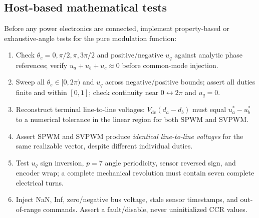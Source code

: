 \documentclass[10pt,letterpaper]{article}
\newcommand{\Vdc}{V_{\mathrm{dc}}}
\begin{document}
\subsection{Host-based mathematical tests}
Before any power electronics are connected, implement property-based or exhaustive-angle tests for the pure modulation function:
\begin{enumerate}
\item Check $\theta_e=0,\pi/2,\pi,3\pi/2$ and positive/negative $u_q$ against analytic phase references; verify $u_a+u_b+u_c\approx0$ before common-mode injection.
\item Sweep all $\theta_e\in[0,2\pi)$ and $u_q$ across negative/positive bounds; assert all duties finite and within $[0,1]$; check continuity near $0\leftrightarrow2\pi$ and $u_q=0$.
\item Reconstruct terminal line-to-line voltages: $\Vdc(d_a-d_b)$ must equal $u_a^*-u_b^*$ to a numerical tolerance in the linear region for both SPWM and SVPWM.
\item Assert SPWM and SVPWM produce \emph{identical line-to-line voltages} for the same realizable vector, despite different individual duties.
\item Test $u_q$ sign inversion, $p=7$ angle periodicity, sensor reversed sign, and encoder wrap; a complete mechanical revolution must contain seven complete electrical turns.
\item Inject NaN, Inf, zero/negative bus voltage, stale sensor timestamps, and out-of-range commands. Assert a fault/disable, never uninitialized CCR values.
\end{enumerate}
\end{document}
